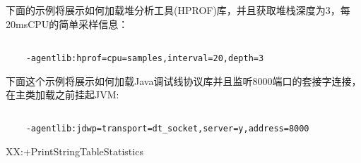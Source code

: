 下面的示例将展示如何加载堆分析工具(HPROF)库，并且获取堆栈深度为3，每20msCPU的简单采样信息：

\begin{lstlisting}[language=cshell]

    -agentlib:hprof=cpu=samples,interval=20,depth=3

\end{lstlisting}  

下面这个示例将展示如何加载Java调试线协议库并且监听8000端口的套接字连接，在主类加载之前挂起JVM:


\begin{lstlisting}[language=cshell]

    -agentlib:jdwp=transport=dt_socket,server=y,address=8000

\end{lstlisting} 





\-XX:+PrintStringTableStatistics


